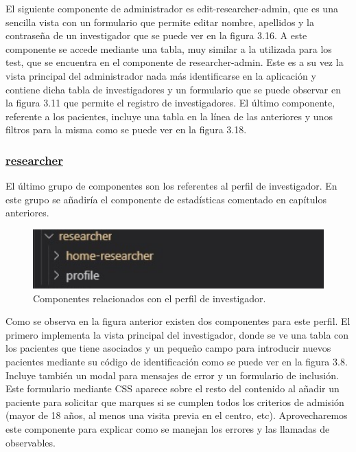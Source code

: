     El siguiente componente de administrador es edit-researcher-admin, que es una sencilla vista con un formulario que permite editar nombre, apellidos y la contraseña de un investigador que se puede ver en la figura 3.16. A este componente se accede mediante una tabla, muy similar a la utilizada para los test, que se encuentra en el componente de researcher-admin. Este es a su vez la vista principal del administrador nada más identificarse en la aplicación y contiene dicha tabla de investigadores y un formulario que se puede observar en la figura 3.11 que permite el registro de investigadores. El último componente, referente a los pacientes, incluye una tabla en la  línea de las anteriores y unos filtros para la misma como se puede ver en la figura 3.18.\newpage
    
    \subsubsection{\underline{researcher}}
    
    El último grupo de componentes son los referentes al perfil de investigador. En este grupo se añadiría el componente de estadísticas comentado en capítulos anteriores.
    
    \begin{figure}[h]
    \centering
    \includegraphics[width=1\textwidth]{images/researcherComponent.jpg}
    \caption{Componentes relacionados con el perfil de investigador.}
    \end{figure}
    \FloatBarrier
    
    Como se observa en la figura anterior existen dos componentes para este perfil. El primero implementa la vista principal del investigador, donde se ve una tabla con los pacientes que tiene asociados y un pequeño campo para introducir nuevos pacientes mediante su código de identificación como se puede ver en la figura 3.8. Incluye también un modal para mensajes de error y un formulario de inclusión. Este formulario mediante CSS aparece sobre el resto del contenido al añadir un paciente para solicitar que marques si se cumplen todos los criterios de admisión (mayor de 18 años, al menos una visita previa en el centro, etc). Aprovecharemos este componente para explicar como se manejan los errores y las llamadas de observables.
    
